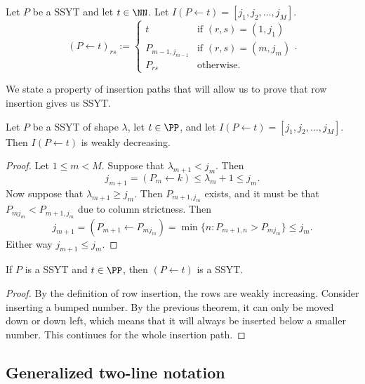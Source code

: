 \documentclass{article}
\begin{document}
\begin{definition}
    Let $P$ be a SSYT and let $t \in \NN$. Let $I(P \leftarrow t) = [j_1, j_2, \ldots, j_M]$.
    \[
        (P \leftarrow t)_{rs} := \begin{cases}
            t & \text{if } (r,s) = (1, j_1) \\
            P_{m-1,j_{m-1}} & \text{if }(r,s) = (m, j_m) \\
            P_{rs} & \text{otherwise}.
        \end{cases}.
    \]
\end{definition}

We state a property of insertion paths that will allow us to prove that row insertion gives us SSYT.

\begin{theorem}
    Let $P$ be a SSYT of shape $\lambda$, let $t \in \PP$, and let $I(P\leftarrow t) = [j_1,j_2,\ldots,j_M]$. Then $I(P\leftarrow t)$ is weakly decreasing.
\end{theorem}

\begin{proof}
    Let $1 \leq m < M$.
    Suppose that $\lambda_{m+1} < j_m$. Then 
    \[
        j_{m+1} = (P_m \leftarrow k) \leq \lambda_m+1 \leq j_m.
    \]
    Now suppose that $\lambda_{m+1} \geq j_m$. 
    Then $P_{m+1,j_m}$ exists, and it must be that $P_{mj_m} < P_{m+1,j_m}$ due to column strictness. Then
    \[
        j_{m+1} = (P_{m+1} \leftarrow P_{mj_m}) = \min \{n:P_{m+1,n}>P_{mj_m}\} \leq j_m.
    \]
    Either way $j_{m+1} \leq j_m$.
\end{proof}

\begin{corollary}\label{InsertionPreservesSSYT}
    If $P$ is a SSYT and $t \in \PP$, then $(P \leftarrow t)$ is a SSYT.
\end{corollary}

\begin{proof}
    By the definition of row insertion, the rows are weakly increasing. Consider inserting a bumped number. By the previous theorem, it can only be moved down or down left, which means that it will always be inserted below a smaller number. This continues for the whole insertion path.
\end{proof}

\subsection{Generalized two-line notation}
\end{document}
